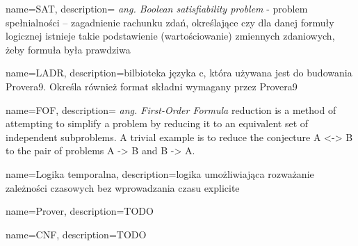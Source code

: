 
 {
    name=SAT,
    description={ \textit{ang. Boolean satisfiability problem} - problem spełnialności – zagadnienie rachunku zdań, określające czy dla danej formuły logicznej istnieje takie podstawienie (wartościowanie) zmiennych zdaniowych, żeby formuła była prawdziwa}
}

 {
    name=LADR,
    description={bilbioteka języka c, która używana jest do budowania Provera9. Określa również format składni wymagany przez Provera9}
}

 {
    name=FOF,
    description={ \textit{ang. First-Order Formula} reduction is a method of attempting to simplify a problem by reducing it to an equivalent set of independent subproblems. A trivial example is to reduce the conjecture A <-> B to the pair of problems A -> B and B -> A.}
}

 {
    name=Logika temporalna,
    description={logika umożliwiająca rozważanie zależności czasowych bez wprowadzania czasu explicite}
}

 {
    name=Prover,
    description={TODO}
}

 {
    name=CNF,
    description={TODO}
}
